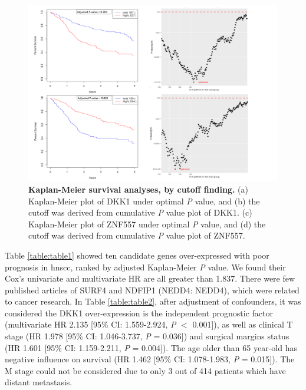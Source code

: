 \documentclass[jpm,article,submit,moreauthors,pdftex]{Definitions/mdpi}
\newcommand{\bcaption}[2]{\caption{\textbf{#1} #2}}
\begin{document}
\begin{figure}[hp]
\centering
\includegraphics[width=15cm]{Figure4.pdf}
\bcaption{Kaplan-Meier survival analyses, by cutoff finding.}
{(a) Kaplan-Meier plot of DKK1 under optimal \textit{P} value, and (b) the cutoff was derived from cumulative \textit{P} value plot of DKK1. (c) Kaplan-Meier plot of ZNF557 under optimal \textit{P} value, and (d) the cutoff was derived from cumulative \textit{P} value plot of ZNF557.}
\label{fig:figure4}
\end{figure}

\clearpage

Table \ref{table:table1} showed ten candidate genes over-expressed with poor prognosis in \acrshort{hnscc}, ranked by adjusted Kaplan-Meier \textit{P} value. We found their Cox's univariate and multivariate HR are all greater than 1.837. There were few published articles of \acrfull{SURF4} and \acrfull{NDFIP1} (\acrshort{NEDD4}: \acrlong{NEDD4}), which were related to cancer research.
In Table \ref{table:table2},
after adjustment of confounders, it was considered the \acrshort{DKK1} over-expression is the independent prognostic factor (multivariate HR 2.135 [95\% CI: 1.559-2.924, \textit{P} $<$ 0.001]), as well as clinical T stage (HR 1.978 [95\% CI: 1.046-3.737, \textit{P} = 0.036]) and surgical margins status (HR 1.601 [95\% CI: 1.159-2.211, \textit{P} = 0.004]). The age older than 65 year-old has negative influence on survival (HR 1.462 [95\% CI: 1.078-1.983, \textit{P} = 0.015]). The M stage could not be considered due to only 3 out of 414 patients which have distant metastasis.
\end{document}
